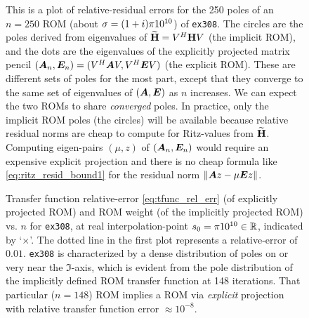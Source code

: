 \begin{figure}
\caption{\label{fig:308polesn250} This is a plot of relative-residual errors for the 250 poles of an $n=250$ ROM (about $\sigma=(1+i)\pi 10^{10}$) of \texttt{ex308}.  The circles are the poles derived from eigenvalues of $\widetilde{\textbf{\textup{H}}}=V^H\textbf{\textup{H}} V$ (the implicit ROM), and the dots are the eigenvalues of the explicitly projected matrix pencil $(\bm{A}_n,\bm{E}_n) = (V^H\bm{A} V, V^H\bm{E} V)$ (the explicit ROM).   These are different sets of poles for the most part, except that they converge to the same set of eigenvalues of $(\bm{A},\bm{E})$ as $n$ increases.   We can expect the two ROMs to share \emph{converged} poles.  In practice, only the implicit ROM poles (the circles) will be available because relative residual norms are cheap to compute for Ritz-values from $\widetilde{\textbf{\textup{H}}}$.   Computing eigen-pairs $(\mu,z)$ of $(\bm{A}_n,\bm{E}_n)$ would require an expensive explicit projection and there is no cheap formula like     \eqref{eq:ritz_resid_bound1} for the residual norm $\| \bm{A} z - \mu \bm{E} z \|$. }
\end{figure}
\smallskip



\begin{figure}[htbp]
\centering
{}

\caption{\label{fig:308benchmark1} Transfer function relative-error \eqref{eq:tfunc_rel_err} (of explicitly projected ROM) and ROM weight (of the implicitly projected ROM) vs. $n$ for \texttt{ex308}, at real interpolation-point $s_0 = \pi 10^{10}\in\mathbb{R}$, indicated by `$\times$'.     The dotted line in the first plot  represents a relative-error of $0.01$.   \texttt{ex308} is characterized by a dense distribution of poles on or very near the $\Im$-axis, which is evident from the pole distribution of the implicitly defined ROM transfer function at 148 iterations.  That particular ($n=148$) ROM implies a ROM via \emph{explicit} projection with relative transfer function error $\approx 10^{-8}$. }
\end{figure}


